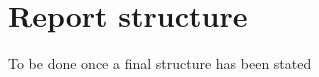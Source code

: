 \section{Report structure}
\label{sec:report_structure}
To be done once a final structure has been stated
